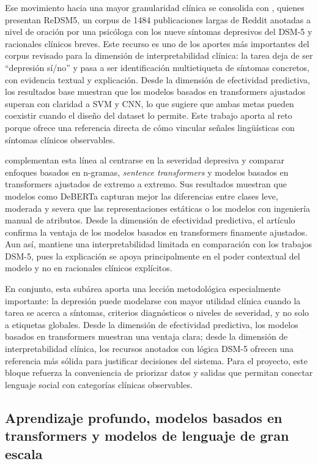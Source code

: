 Ese movimiento hacia una mayor granularidad clínica se consolida con \citet{bao2025redsm5}, quienes presentan ReDSM5, un corpus de 1484 publicaciones largas de Reddit anotadas a nivel de oración por una psicóloga con los nueve síntomas depresivos del DSM-5 y racionales clínicos breves. Este recurso es uno de los aportes más importantes del corpus revisado para la dimensión de interpretabilidad clínica: la tarea deja de ser ``depresión sí/no'' y pasa a ser identificación multietiqueta de síntomas concretos, con evidencia textual y explicación. Desde la dimensión de efectividad predictiva, los resultados base muestran que los modelos basados en transformers ajustados superan con claridad a SVM y CNN, lo que sugiere que ambas metas pueden coexistir cuando el diseño del dataset lo permite. Este trabajo aporta al reto porque ofrece una referencia directa de cómo vincular señales lingüísticas con síntomas clínicos observables.

\citet{qasim2025depression} complementan esta línea al centrarse en la severidad depresiva y comparar enfoques basados en n-gramas, \textit{sentence transformers} y modelos basados en transformers ajustados de extremo a extremo. Sus resultados muestran que modelos como DeBERTa capturan mejor las diferencias entre clases leve, moderada y severa que las representaciones estáticas o los modelos con ingeniería manual de atributos. Desde la dimensión de efectividad predictiva, el artículo confirma la ventaja de los modelos basados en transformers finamente ajustados. Aun así, mantiene una interpretabilidad limitada en comparación con los trabajos DSM-5, pues la explicación se apoya principalmente en el poder contextual del modelo y no en racionales clínicos explícitos.

En conjunto, esta subárea aporta una lección metodológica especialmente importante: la depresión puede modelarse con mayor utilidad clínica cuando la tarea se acerca a síntomas, criterios diagnósticos o niveles de severidad, y no solo a etiquetas globales. Desde la dimensión de efectividad predictiva, los modelos basados en transformers muestran una ventaja clara; desde la dimensión de interpretabilidad clínica, los recursos anotados con lógica DSM-5 ofrecen una referencia más sólida para justificar decisiones del sistema. Para el proyecto, este bloque refuerza la conveniencia de priorizar datos y salidas que permitan conectar lenguaje social con categorías clínicas observables.

\subsection{Aprendizaje profundo, modelos basados en transformers y modelos de lenguaje de gran escala}

